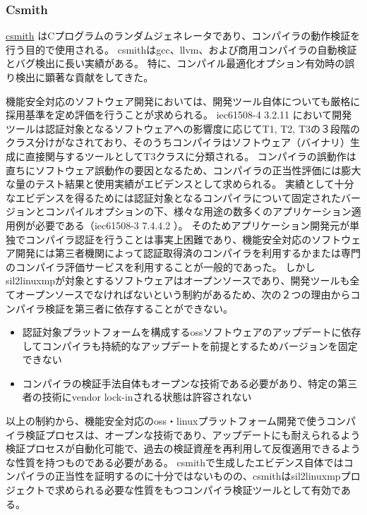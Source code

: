 \subsubsection{Csmith}
\label{compveri}
\href{https://embed.cs.utah.edu/csmith/}{\acrshort{csmith}} \cite{csmith}はCプログラムのランダムジェネレータであり、コンパイラの動作検証を行う目的で使用される。
\acrshort{csmith}は\acrshort{gcc}、\acrshort{llvm}、および商用コンパイラの自動検証とバグ検出に長い実績がある。
特に、コンパイル最適化オプション有効時の誤り検出に顕著な貢献をしてきた。
\par
機能安全対応のソフトウェア開発においては、開発ツール自体についても厳格に採用基準を定め評価を行うことが求められる。
\acrshort{iec61508}-4 3.2.11 において開発ツールは認証対象となるソフトウェアへの影響度に応じてT1, T2, T3の３段階のクラス分けがなされており、そのうちコンパイラはソフトウェア（バイナリ）生成に直接関与するツールとしてT3クラスに分類される。
コンパイラの誤動作は直ちにソフトウェア誤動作の要因となるため、コンパイラの正当性評価には膨大な量のテスト結果と使用実績がエビデンスとして求められる。
実績として十分なエビデンスを得るためには認証対象となるコンパイラについて固定されたバージョンとコンパイルオプションの下、様々な用途の数多くのアプリケーション適用例が必要である（\acrshort{iec61508}-3 7.4.4.2 ）。
そのためアプリケーション開発元が単独でコンパイラ認証を行うことは事実上困難であり、機能安全対応のソフトウェア開発には第三者機関によって認証取得済のコンパイラを利用するかまたは専門のコンパイラ評価サービスを利用することが一般的であった。
しかし\acrshort{sil2linuxmp}が対象とするソフトウェアはオープンソースであり、開発ツールも全てオープンソースでなければないという制約があるため、次の２つの理由からコンパイラ検証を第三者に依存することができない。
\begin{itemize}
  \item 認証対象プラットフォームを構成する\acrshort{oss}ソフトウェアのアップデートに依存してコンパイラも持続的なアップデートを前提とするためバージョンを固定できない
  \item コンパイラの検証手法自体もオープンな技術である必要があり、特定の第三者の技術にvendor lock-inされる状態は許容されない
\end{itemize}
\par
以上の制約から、機能安全対応の\acrshort{oss}・\acrshort{linux}プラットフォーム開発で使うコンパイラ検証プロセスは、オープンな技術であり、アップデートにも耐えられるよう検証プロセスが自動化可能で、過去の検証資産を再利用して反復適用できるような性質を持つものである必要がある。
\acrshort{csmith}で生成したエビデンス自体ではコンパイラの正当性を証明するのに十分ではないものの、\acrshort{csmith}は\acrshort{sil2linuxmp}プロジェクトで求められる必要な性質をもつコンパイラ検証ツールとして有効である。
